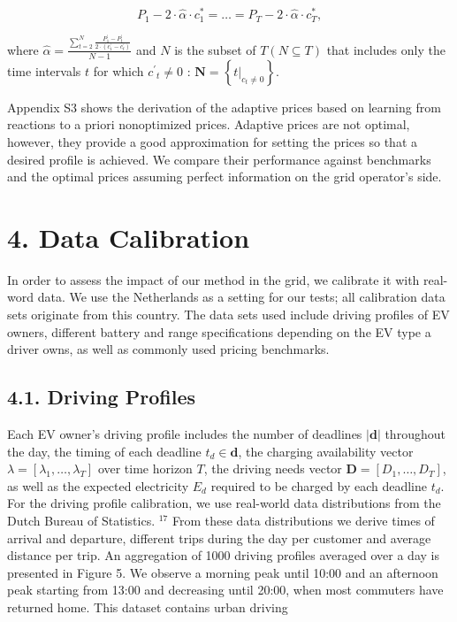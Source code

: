 \documentclass[10pt]{article}
\begin{document}
\begin{equation*}
P_{1}-2 \cdot \hat{\alpha} \cdot c_{1}^{*}=\ldots=P_{T}-2 \cdot \hat{\alpha} \cdot c_{T}^{*}, \tag{14}
\end{equation*}


where $\hat{\alpha}=\frac{\sum_{t=2}^{N} \frac{P_{1}^{\prime}-P_{t}^{\prime}}{2 \cdot\left(c_{1}^{\prime}-c_{t}^{\prime}\right)}}{N-1}$ and $N$ is the subset of $T(N \subseteq T)$ that includes only the time intervals $t$ for which $c^{\prime}{ }_{t} \neq 0$ : $\mathbf{N}=\left\{\left.t\right|_{c_{t} \neq 0}\right\}$.

Appendix S3 shows the derivation of the adaptive prices based on learning from reactions to a priori nonoptimized prices. Adaptive prices are not optimal, however, they provide a good approximation for setting the prices so that a desired profile is achieved. We compare their performance against benchmarks and the optimal prices assuming perfect information on the grid operator's side.

\section*{4. Data Calibration}
In order to assess the impact of our method in the grid, we calibrate it with real-word data. We use the Netherlands as a setting for our tests; all calibration data sets originate from this country. The data sets used include driving profiles of EV owners, different battery and range specifications depending on the EV type a driver owns, as well as commonly used pricing benchmarks.

\subsection*{4.1. Driving Profiles}
Each EV owner's driving profile includes the number of deadlines $|\mathbf{d}|$ throughout the day, the timing of each deadline $t_{d} \in \mathbf{d}$, the charging availability vector $\lambda=\left[\lambda_{1}, \ldots, \lambda_{T}\right]$ over time horizon $T$, the driving needs vector $\mathbf{D}=\left[D_{1}, \ldots, D_{T}\right]$, as well as the expected electricity $E_{d}$ required to be charged by each deadline $t_{d}$. For the driving profile calibration, we use real-world data distributions from the Dutch Bureau of Statistics. ${ }^{17}$ From these data distributions we derive times of arrival and departure, different trips during the day per customer and average distance per trip. An aggregation of 1000 driving profiles averaged over a day is presented in Figure 5. We observe a morning peak until 10:00 and an afternoon peak starting from 13:00 and decreasing until 20:00, when most commuters have returned home. This dataset contains urban driving
\end{document}

